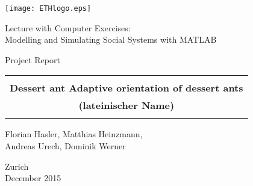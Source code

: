 
\thispagestyle{empty}

\begin{center}
\texttt{[image: ETHlogo.eps]}

\bigskip


\bigskip


\bigskip


\LARGE{ 	Lecture with Computer Exercises:\\ }
\LARGE{ Modelling and Simulating Social Systems with MATLAB\\}

\bigskip

\bigskip

\small{Project Report}\\

\bigskip

\bigskip

\bigskip

\bigskip


\begin{tabular}{|c|}
\hline
\\
\textbf{\LARGE{Dessert ant Adaptive orientation of dessert ants }}\\
\textbf{\LARGE{(lateinischer Name)}}\\
\\
\hline
\end{tabular}
\bigskip

\bigskip

\bigskip

\LARGE{Florian Hasler, Matthias Heinzmann,
\\ Andreas Urech,  Dominik Werner}



\bigskip

\bigskip

\bigskip

\bigskip

\bigskip

\bigskip

\bigskip

\bigskip

Zurich\\
December 2015\\

\end{center}


